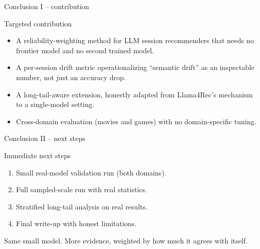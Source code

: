 \documentclass[aspectratio=169,12pt]{beamer}
\begin{document}
\begin{frame}{Conclusion I -- contribution}
\begin{block}{Targeted contribution}
\begin{itemize}
  \item A reliability-weighting method for LLM session recommenders that
        needs no frontier model and no second trained model.
  \item A per-session drift metric operationalizing ``semantic drift''
        as an inspectable number, not just an accuracy drop.
  \item A long-tail-aware extension, honestly adapted from Llama4Rec's
        mechanism to a single-model setting.
  \item Cross-domain evaluation (movies and games) with no domain-specific
        tuning.
\end{itemize}
\end{block}
\end{frame}

\begin{frame}{Conclusion II -- next steps}
\begin{block}{Immediate next steps}
\begin{enumerate}
  \item Small real-model validation run (both domains).
  \item Full sampled-scale run with real statistics.
  \item Stratified long-tail analysis on real results.
  \item Final write-up with honest limitations.
\end{enumerate}
\end{block}

\vspace{1em}
\centering
\Large\textcolor{DeepBlue}{Same small model. More evidence, weighted by how much it agrees with itself.}
\end{frame}
\end{document}
